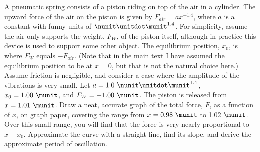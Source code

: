  A pneumatic spring consists of a piston riding on top
of the air in a cylinder. The upward force of the air on
the piston is given by $F_{air}=ax^{-1.4}$, where $a$ is a
constant with funny units of $\nunit\unitdot\munit^{1.4}$. For simplicity,
assume the air only supports the weight, $F_W$, of the
piston itself, although in practice this device is used to
support some other object. The equilibrium position, $x_0$,
is where $F_W$ equals $-F_{air}$. (Note that in the main
text I have assumed the equilibrium position to be at $x=0$,
but that is not the natural choice here.) Assume friction
is negligible, and consider a case where the amplitude of
the vibrations is very small. Let $a=1.0\ \nunit\unitdot\munit^{1.4}$, 
$x_0=1.00\ \munit$, and $F_W=-1.00\ \nunit$. The piston is released from
$x=1.01\ \munit$. Draw a neat, accurate graph of the total
force, $F$, as a function of $x$, on graph paper, covering
the range from $x=0.98\ \munit$ to 1.02 $\munit$. Over this small
range, you will find that the force is very nearly
proportional to $x-x_0$. Approximate the curve with a
straight line, find its slope, and derive the approximate
period of oscillation. \answercheck
